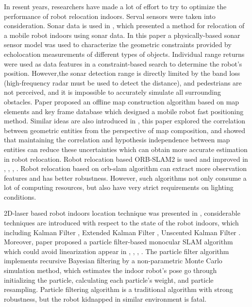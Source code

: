 \documentclass[journal]{IEEEtran}
\begin{document}
In resent years, researchers have made a lot of effort to try to optimize the performance of robot relocation indoors. Serval sensors were  taken into consideration. Sonar data is used in \cite{lim2000mobile}, which presented a method for relocation of a mobile robot indoors using sonar data. In this paper a physically-based sonar sensor model was used to characterize the geometric constraints provided by echolocation measurements of different types of objects. Individual range returns were used as data features in a constraint-based search to determine the robot's position. However,the sonar detection range is directly limited by the band loss (high-frequency radar must be used to detect the distance), and pedestrians are not perceived, and it is impossible to accurately simulate all surrounding obstacles.
Paper \cite{yang2019rapid} proposed an offline map construction algorithm based on map elements and key frame database which designed a mobile robot fast positioning method. Similar ideas are also introduced in     \cite{castellanos1997building}, this paper explored the correlation between geometric entities from the perspective of map composition, and showed that maintaining the correlation and hypothesis independence between map entities can reduce these uncertainties which can obtain more accurate estimation in robot relocation.  Robot relocation based ORB-SLAM2 \cite{mur2015orb} is used and improved in \cite{mur2017orb}, \cite{engel2014lsd}, \cite{yang2016pop}, \cite{mur2017visual}. Robot  relocation based on orb-slam algorithm can extract more observation features and has better robustness. However, such algorithms not only consume a lot of computing resources, but also have very strict requirements on lighting conditions.

2D-laser based robot indoors location technique was presented in \cite{thrun2005probabilistic}, considerable techniques are introduced with respect to the state of the robot indoors, which including Kalman Filter \cite{kalman1960new}, Extended Kalman Filter \cite{bailey2006consistency}, Unscented Kalman Filter \cite{martinez2005unscented}. Moreover, paper \cite{sim2006design} proposed a particle filter-based monocular SLAM algorithm which could  avoid linearization appear in   \cite{thrun2005probabilistic}, \cite{kalman1960new}, \cite{bailey2006consistency}, \cite{martinez2005unscented}. The particle filter algorithm implements recursive Bayesian filtering by a non-parametric Monte Carlo \cite{robert2013monte} simulation method, which estimates the indoor robot's pose go through initializing the particle, calculating each particle's weight, and particle resampling. Particle filtering algorithm is a traditional algorithm with strong robustness, but the robot kidnapped  in similar environment is fatal.
\end{document}
